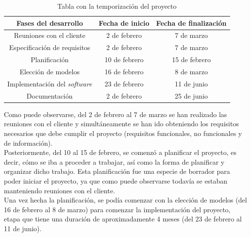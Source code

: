 \begin{table}[H]
        \centering
        \begin{tabular}{c c c } \hline
            \toprule
            \rowcolor{blue!50} 
            \textbf{Fases del desarrollo}   & \textbf{Fecha de inicio} & \textbf{Fecha de finalización} \\
            \midrule
            \rowcolor{blue!25} 
            Reuniones con el cliente        & 2 de febrero      & 7 de marzo    \\ 
            \rowcolor{blue!10} 
            Especificación de requisitos    & 2 de febrero      & 7 de marzo    \\ 
            \rowcolor{blue!25} 
            Planificación                   & 10 de febrero     & 15 de febrero \\ 
            \rowcolor{blue!10} 
            Elección de modelos             & 16 de febrero     & 8 de marzo \\ 
            \rowcolor{blue!25} 
            Implementación del \textit{software}     & 23 de febrero     & 11 de junio    \\ 
            \rowcolor{blue!10} 
            Documentación                   & 2 de febrero      & 25 de junio    \\ \bottomrule
        \end{tabular}
        \label{tab:planning}
        \caption{Tabla con la temporización del proyecto}
\end{table}

Como puede observarse, del 2 de febrero al 7 de marzo se han realizado las reuniones con
el cliente y simultáneamente se han ido obteniendo los requisitos necesarios que debe cumplir
el proyecto (requisitos funcionales, no funcionales y de información).\\

Posteriormente, del 10 al 15 de febrero, se comenzó a planificar el proyecto, es
decir, cómo se iba a proceder a trabajar, así como la forma de planificar y organizar dicho
trabajo. Esta planificación fue una especie de borrador para poder iniciar el proyecto, ya
que como puede observarse todavía se estaban manteniendo reuniones con el cliente.\\

Una vez hecha la planificación, se podía comenzar con la elección de modelos (del 16 de
febrero al 8 de marzo) para comenzar la implementación del proyecto, etapa que
tiene una duración de aproximadamente 4 meses (del 23 de febrero al 11 de junio).\\

